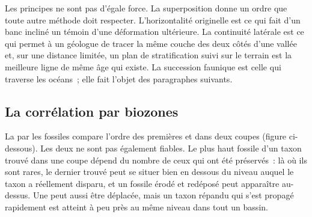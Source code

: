 Les principes ne sont pas d'égale force. La superposition donne un ordre que toute
autre méthode doit respecter. L'horizontalité originelle est ce qui fait d'un banc incliné un
témoin d'une déformation ultérieure. La continuité latérale est ce qui permet à un géologue de
tracer la même couche des deux côtés d'une vallée et, sur une distance limitée, un
plan de stratification suivi sur le terrain est la meilleure ligne de même âge qui existe.
La succession faunique est celle qui traverse les océans~; elle fait l'objet des
paragraphes suivants.

\subsection*{La corrélation par biozones}

La  par les fossiles compare l'ordre des premières et  dans deux
coupes (figure ci-dessous). Les deux ne sont pas également fiables. Le plus haut fossile
d'un taxon trouvé dans une coupe dépend du nombre de ceux qui ont été préservés~: là où ils sont
rares, le dernier trouvé peut se situer bien en dessous du niveau auquel le taxon a réellement
disparu, et un fossile érodé et redéposé peut apparaître au-dessus. Une  peut aussi être déplacée, mais un taxon répandu qui s'est propagé rapidement est
atteint à peu près au même niveau dans tout un bassin.

